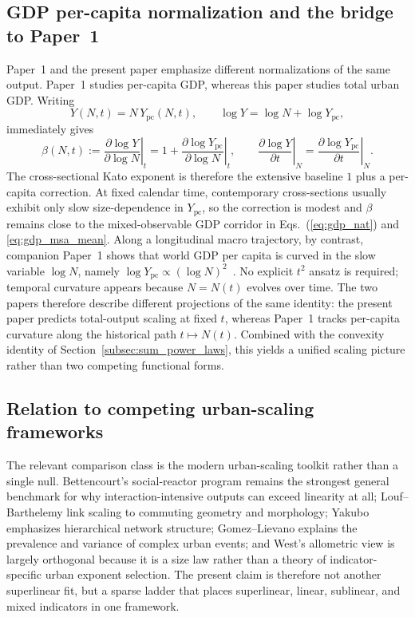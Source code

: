 \subsection{GDP per-capita normalization and the bridge to Paper~1}\label{subsec:GDP_normalization_bridge}
Paper~1 and the present paper emphasize different normalizations of the same output. Paper~1 studies per-capita GDP, whereas this paper studies total urban GDP. Writing
\begin{equation}
Y(N,t)=N\,Y_{\mathrm{pc}}(N,t),\qquad\log Y=\log N+\log Y_{\mathrm{pc}},
\label{eq:GDP_decomposition}
\end{equation}
immediately gives
\begin{equation}
\beta(N,t):=\left.\frac{\partial \log Y}{\partial \log N}\right|_{t}=1+\left.\frac{\partial \log Y_{\mathrm{pc}}}{\partial \log N}\right|_{t},\qquad\left.\frac{\partial \log Y}{\partial t}\right|_{N}=\left.\frac{\partial \log Y_{\mathrm{pc}}}{\partial t}\right|_{N}.
\label{eq:per_capita_link}
\end{equation}
The cross-sectional Kato exponent is therefore the extensive baseline \(1\) plus a per-capita correction. At fixed calendar time, contemporary cross-sections usually exhibit only slow size-dependence in \(Y_{\mathrm{pc}}\), so the correction is modest and \(\beta\) remains close to the mixed-observable GDP corridor in Eqs.~(\ref{eq:gdp_nat}) and \eqref{eq:gdp_msa_mean}. Along a longitudinal macro trajectory, by contrast, companion Paper~1 shows that world GDP per capita is curved in the slow variable \(\log N\), namely \(\log Y_{\mathrm{pc}}\propto (\log N)^2\)~\cite{Kato2026a}. No explicit \(t^2\) ansatz is required; temporal curvature appears because \(N=N(t)\) evolves over time. The two papers therefore describe different projections of the same identity: the present paper predicts total-output scaling at fixed \(t\), whereas Paper~1 tracks per-capita curvature along the historical path \(t\mapsto N(t)\). Combined with the convexity identity of Section~\ref{subsec:sum_power_laws}, this yields a unified scaling picture rather than two competing functional forms.

\subsection{Relation to competing urban-scaling frameworks}
The relevant comparison class is the modern urban-scaling toolkit rather than a
single null. Bettencourt's social-reactor program remains the strongest general
benchmark for why interaction-intensive outputs can exceed linearity at all;
Louf--Barthelemy link scaling to commuting geometry and morphology;
Yakubo emphasizes hierarchical network structure; Gomez--Lievano explains the
prevalence and variance of complex urban events; and West's allometric view is
largely orthogonal because it is a size law rather than a theory of
indicator-specific urban exponent selection. The present claim is therefore not
another superlinear fit, but a sparse ladder that places superlinear, linear,
sublinear, and mixed indicators in one framework.

